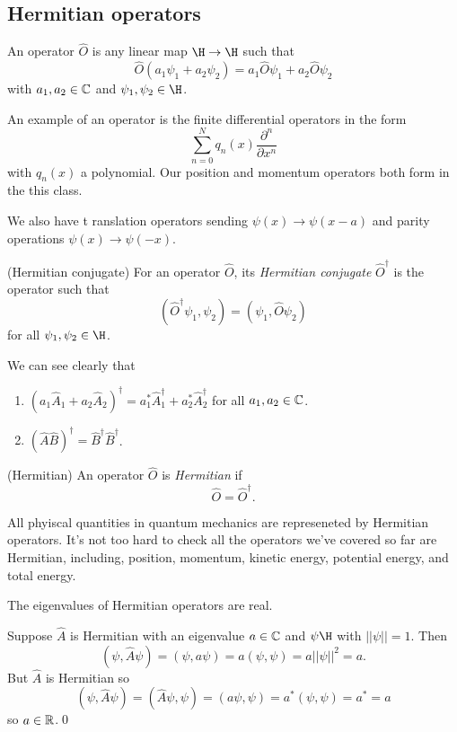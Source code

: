 \documentclass{article}
\begin{document}
\subsection{Hermitian operators}
\begin{definition}
  An operator $ \hat O $ is any linear map $ \H\to\H $ such that
  \[
    \hat O(a_1\psi_1+a_2\psi_2)=a_1\hat O\psi_1+a_2\hat O\psi_2
  \]
  with $ a_1,a_2\in \mathbb{C} $ and $ \psi_1,\psi_2\in\H $.
\end{definition}
An example of an operator is the finite differential operators in the form
\[
	\sum_{n=0}^Nq_n(x)\frac{\partial^n}{\partial x^n}
\]
with $ q_n(x) $ a polynomial. Our position and momentum operators both form in the this class.\par
We also have t ranslation operators sending $ \psi(x)\to\psi(x-a) $ and parity operations $ \psi(x)\to\psi(-x) $.
\begin{definition}
	(Hermitian conjugate) For an operator $ \hat O $, its \textit{Hermitian conjugate} $ \hat O^\dagger $ is the operator such that
	\[
		(\hat O^\dagger \psi_1,\psi_2)=(\psi_1,\hat O\psi_2)
	\]
	for all $ \psi_1,\psi_2\in \H $.
\end{definition}
\begin{remark}
   We can see clearly that
   \begin{enumerate}
	   \item $ (a_1\hat A_1+a_2\hat A_2)^\dagger=a_1^*\hat A_1^\dagger + a_2^*\hat A_2^\dagger $ for all $ a_1,a_2\in\mathbb{C} $.
	   \item $ (\hat A\hat B)^\dagger = \hat B^\dagger\hat B^\dagger $.
   \end{enumerate}
\end{remark}
\begin{definition}
	(Hermitian) An operator $ \hat O $ is \textit{Hermitian} if
	\[
	  \hat O =\hat O^\dagger.
	\]
\end{definition}
All phyiscal quantities in quantum mechanics are represeneted by Hermitian operators. It's not too hard to check all the operators we've covered so far are Hermitian, including, position, momentum, kinetic energy, potential energy, and total energy.
\begin{theorem}
  The eigenvalues of Hermitian operators are real.
\end{theorem}
\pf Suppose $ \hat A $ is Hermitian with an eigenvalue $ a\in \mathbb{C} $ and $ \psi \H $ with $ ||\psi||=1 $. Then
\[
	(\psi,\hat A\psi)=(\psi,a\psi)=a(\psi,\psi)=a||\psi||^2=a.
\]
But $ \hat A $ is Hermitian so
\[
	(\psi,\hat A\psi)=(\hat A\psi,\psi)=(a\psi,\psi)=a^*(\psi,\psi)=a^*=a
\]
so $ a\in\mathbb{R} $.\qed
\end{document}

